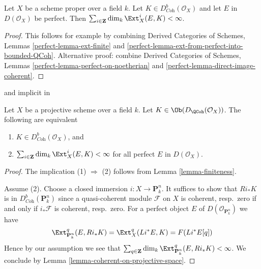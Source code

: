 \begin{lemma}
\label{lemma-finiteness}
Let $X$ be a scheme proper over a field $k$. Let
$K \in D^b_{\textit{Coh}}(\mathcal{O}_X)$ and let $E$ in $D(\mathcal{O}_X)$
be perfect. Then
$\sum_{i \in \mathbf{Z}} \dim_k \Ext^i_X(E, K) < \infty$.
\end{lemma}

\begin{proof}
This follows for example by combining
Derived Categories of Schemes, Lemmas \ref{perfect-lemma-ext-finite} and
\ref{perfect-lemma-ext-from-perfect-into-bounded-QCoh}.
Alternative proof: combine
Derived Categories of Schemes, Lemmas
\ref{perfect-lemma-perfect-on-noetherian} and
\ref{perfect-lemma-direct-image-coherent}.
\end{proof}

\begin{lemma}
\label{lemma-characterize-dbcoh-projective}
\begin{reference}
\cite[Lemma 7.46]{Rouquier-dimensions} and implicit in
\cite[Theorem A.1]{BvdB}
\end{reference}
Let $X$ be a projective scheme over a field $k$. Let
$K \in \Ob(D_\QCoh(\mathcal{O}_X))$. The following are equivalent
\begin{enumerate}
\item $K \in D^b_{\textit{Coh}}(\mathcal{O}_X)$, and
\item $\sum_{i \in \mathbf{Z}} \dim_k \Ext^i_X(E, K) < \infty$
for all perfect $E$ in $D(\mathcal{O}_X)$.
\end{enumerate}
\end{lemma}

\begin{proof}
The implication (1) $\Rightarrow$ (2) follows from
Lemma \ref{lemma-finiteness}.

\medskip\noindent
Assume (2).
Choose a closed immersion $i : X \to \mathbf{P}^n_k$. It suffices to show
that $Ri_*K$ is in $D^b_{\textit{Coh}}(\mathbf{P}^n_k)$ since a quasi-coherent
module $\mathcal{F}$ on $X$ is coherent, resp.\ zero if and only if
$i_*\mathcal{F}$ is coherent, resp.\ zero. For a perfect object $E$
of $D(\mathcal{O}_{\mathbf{P}^n_k})$ we have
$$
\Ext^q_{\mathbf{P}^n_k}(E, Ri_*K) = \Ext^q_X(Li^*E, K) = F(Li^*E[q])
$$
Hence by our assumption we see that
$\sum_{q \in \mathbf{Z}} \dim_k \Ext^q_{\mathbf{P}^n_k}(E, Ri_*K) < \infty$.
We conclude by Lemma \ref{lemma-coherent-on-projective-space}.
\end{proof}






